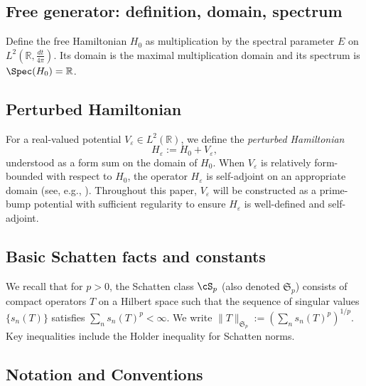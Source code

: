 ﻿\documentclass[12pt,a4paper]{article}
\theoremstyle{definition}
\theoremstyle{remark}
\newcommand{\RR}{\mathbb{R}}
\begin{document}
\subsection{Free generator: definition, domain, spectrum}
Define the free Hamiltonian $H_0$ as multiplication by the spectral parameter $E$ on $L^2(\RR, \tfrac{dt}{4\pi})$. Its domain is the maximal multiplication domain and its spectrum is $\Spec(H_0) = \RR$.

\subsection{Perturbed Hamiltonian}
\label{subsec:perturbed-hamiltonian}
For a real-valued potential $V_\varepsilon \in L^2(\RR)$, we define the \emph{perturbed Hamiltonian}
\begin{equation}\label{eq:H-epsilon-def}
  H_\varepsilon := H_0 + V_\varepsilon,
\end{equation}
understood as a form sum on the domain of $H_0$. When $V_\varepsilon$ is relatively form-bounded with respect to $H_0$, the operator $H_\varepsilon$ is self-adjoint on an appropriate domain (see, e.g., \cite{Kato1966PTLO}). Throughout this paper, $V_\varepsilon$ will be constructed as a prime-bump potential with sufficient regularity to ensure $H_\varepsilon$ is well-defined and self-adjoint.

\subsection{Basic Schatten facts and constants}
We recall that for $p > 0$, the Schatten class $\cS_p$ (also denoted $\mathfrak{S}_p$) consists of compact operators $T$ on a Hilbert space such that the sequence of singular values $\{s_n(T)\}$ satisfies $\sum_n s_n(T)^p < \infty$. We write $\|T\|_{\mathfrak{S}_p} := (\sum_n s_n(T)^p)^{1/p}$. Key inequalities include the Holder inequality for Schatten norms.

\subsection{Notation and Conventions}
\label{subsec:notation}

\end{document}
